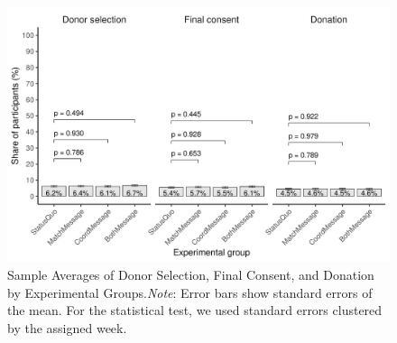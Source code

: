 \documentclass[12pt, a4paper]{article}
\begin{document}
\begin{table}[H]
\begin{threeparttable}
\begin{tablenotes}
\end{tablenotes}
\end{threeparttable}
\end{table}

\begin{figure}[H]
\includegraphics{JMDP RCT - Online Supplementary Material_files/figure-latex/coordinate-diff-mean-1} \caption{Sample Averages of Donor Selection, Final Consent, and Donation by Experimental Groups.\newline \emph{Note}: Error bars show standard errors of the mean. For the statistical test, we used standard errors clustered by the assigned week.}\label{fig:coordinate-diff-mean}
\end{figure}
\end{document}
